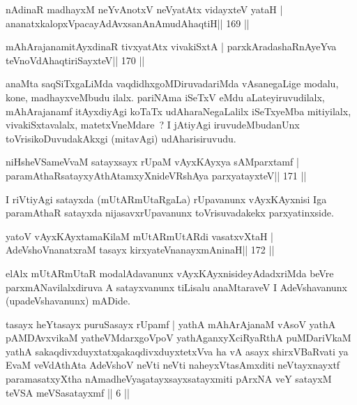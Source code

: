 
\begin{shl}
nA\s\s dinaR madhayxM neYvAnotxV neVyatAtx vidayxteV yataH |
ananatxkalopxVpacayAdAvxsanAnAmudAhaqtiH\hfill || 169 ||
\end{shl}

\begin{shl}
mAhArajanamitAyxdinaR tivxyatAtx vivakiSxtA |
parxkAradashaRnAyeYva teVnoVdAhaqtiriSayxteV\hfill || 170 ||
\end{shl}

\begin{artha}
anaMta saqSiTxgaLiMda vaqdidhxgoMDiruvadariMda vAsanegaLige modalu,
kone, madhayxveMbudu ilalx. pariNAma iSeTxV eMdu aLateyiruvudilalx,
mAhArajanamf itAyxdiyAgi koTaTx udAharaNegaLalilx iSeTxyeMba
mitiyilalx, vivakiSxtavalalx, matetxVneMdare~? I jAtiyAgi
iruvudeMbudanUnx toVrisikoDuvudakAkxgi (mitavAgi) udAharisiruvudu.
\end{artha}

\begin{shl}
niHsheVSameVvaM satayxsayx rUpaM vAyxKAyxya sAMparxtamf |
paramAthaRsatayxyAthAtamxyXnideVRshAya parxyatayxteV\hfill || 171 ||
\end{shl}

\begin{artha}
I riVtiyAgi satayxda (mUtARmUtaRgaLa) rUpavanunx vAyxKAyxnisi Iga
paramAthaR satayxda nijasavxrUpavanunx toVrisuvadakekx parxyatinxside.
\end{artha}

\begin{shl}
yatoV vAyxKAyxtamaKilaM mUtARmUtARdi vasatxvXtaH |
AdeVshoV\s nanatxraM tasayx kirxyateV\s nanayxmAninaH\hfill || 172 ||
\end{shl}

\begin{artha}
elAlx mUtARmUtaR modalAdavanunx vAyxKAyxnisideyAdadxriMda beVre
parxmANavilalxdiruva A satayxvanunx tiLisalu anaMtaraveV I
AdeVshavanunx (upadeVshavanunx) mADide.
\end{artha}



\begin{kandikeshl}
tasayx heYtasayx puruSasayx rUpamf | yathA mAhArAjanaM  vAsoV yathA pAMDAvxvikaM yatheVMdarxgoVpoV yathAganxyXciRyaRthA puMDariVkaM yathA sakaqdivxduyxtatx\c sakaqdivxduyxtetxVva ha vA asayx shirxVBaRvati ya EvaM veVdAthAta AdeVshoV neVti neVti naheyxVtasAmxditi neVtayxnayxtf paramasatxyXtha nAmadheVya\c satayxsayxsatayxmiti pArxNA veY satayxM teVSA meVSa\break satayxmf || 6 ||
\end{kandikeshl}


